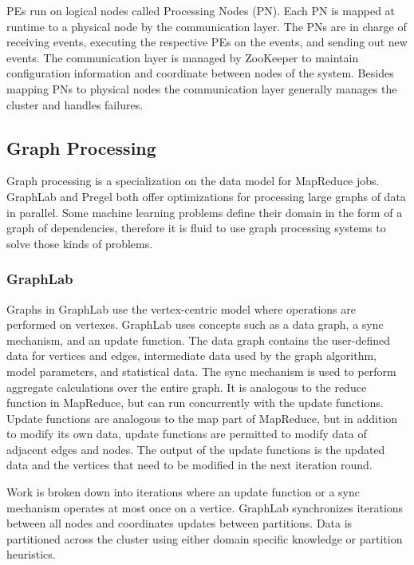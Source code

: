 \documentclass[12pt]{article}
\begin{document}
PEs run on logical nodes called Processing Nodes (PN). Each PN is mapped at runtime to a physical node by the communication layer. The PNs are in charge of receiving events, executing the respective PEs on the events, and sending out new events. The communication layer is managed by ZooKeeper to maintain configuration information and coordinate between nodes of the system. Besides mapping PNs to physical nodes the communication layer generally manages the cluster and handles failures.



\subsection{Graph Processing}

Graph processing is a specialization on the data model for MapReduce jobs. GraphLab and Pregel both offer optimizations for processing large graphs of data in parallel. Some machine learning problems define their domain in the form of a graph of dependencies, therefore it is fluid to use graph processing systems to solve those kinds of problems.

\cite{zhang2016survey,low2012graphlab,malewicz2010pregel}

\subsubsection{GraphLab}

Graphs in GraphLab use the vertex-centric model where operations are performed on vertexes. GraphLab uses concepts such as a data graph, a sync mechanism, and an update function. The data graph contains the user-defined data for vertices and edges, intermediate data used by the graph algorithm, model parameters, and statistical data. The sync mechanism is used to perform aggregate calculations over the entire graph. It is analogous to the reduce function in MapReduce, but can run concurrently with the update functions. Update functions are analogous to the map part of MapReduce, but in addition to modify its own data, update functions are permitted to modify data of adjacent edges and nodes. The output of the update functions is the updated data and the vertices that need to be modified in the next iteration round.

Work is broken down into iterations where an update function or a sync mechanism operates at most once on a vertice. GraphLab synchronizes iterations between all nodes and coordinates updates between partitions. Data is partitioned across the cluster using either domain specific knowledge or partition heuristics.
\end{document}
